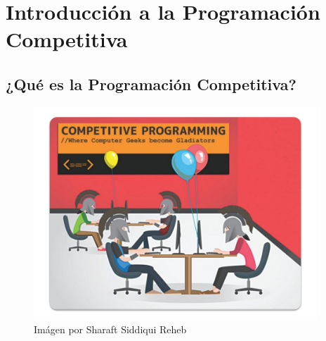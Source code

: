 \documentclass[12pt, fleqn]{report}                             %
\theoremstyle{break}                                            %
\begin{document}
\restoregeometry                                                    %
\nopagecolor                                                        %






\tableofcontents{}
\label{sec:Index}

\clearpage



\part{Introducción a la Programación Competitiva}

    \clearpage
    \chapter{¿Qué es la Programación Competitiva?}

        \begin{figure}[h]
            \includegraphics[width=0.95\textwidth]{CpIntro}
            \caption{Imágen por Sharaft Siddiqui Reheb}
        \end{figure}
    
\end{document}
